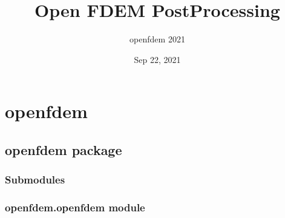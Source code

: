\documentclass[letterpaper,10pt,english]{sphinxmanual}
\title{Open FDEM Post\sphinxhyphen{}Processing}
\date{Sep 22, 2021}
\author{open\sphinxhyphen{}fdem 2021}
\begin{document}
\pagestyle{empty}
\sphinxmaketitle
\pagestyle{plain}
\sphinxtableofcontents
\pagestyle{normal}
\label{\detokenize{index::doc}}



\chapter{openfdem}
\label{\detokenize{modules:openfdem}}\label{\detokenize{modules::doc}}

\section{openfdem package}
\label{\detokenize{openfdem:openfdem-package}}\label{\detokenize{openfdem::doc}}

\subsection{Submodules}
\label{\detokenize{openfdem:submodules}}

\subsection{openfdem.openfdem module}
\label{\detokenize{openfdem:module-openfdem.openfdem}}\label{\detokenize{openfdem:openfdem-openfdem-module}}
\end{document}
